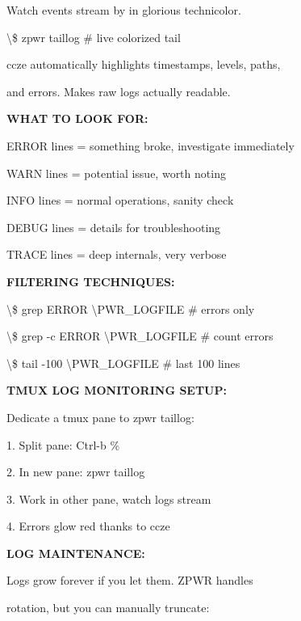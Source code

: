 \documentclass[11pt,a4paper,twoside]{book}
\begin{document}
Watch events stream by in glorious technicolor.

\begin{codebox}
\textbackslash{}\$ zpwr taillog                \# live colorized tail\\
\end{codebox}

ccze automatically highlights timestamps, levels, paths,

and errors. Makes raw logs actually readable.


\vspace{12pt}
{\bfseries\color{neonyellow} WHAT TO LOOK FOR:}\vspace{4pt}

ERROR  lines = something broke, investigate immediately

WARN   lines = potential issue, worth noting

INFO   lines = normal operations, sanity check

DEBUG  lines = details for troubleshooting

TRACE  lines = deep internals, very verbose


\vspace{12pt}
{\bfseries\color{neonyellow} FILTERING TECHNIQUES:}\vspace{4pt}

\textbackslash{}\$ grep ERROR \textbackslash{}PWR\_LOGFILE     \# errors only

\textbackslash{}\$ grep -c ERROR \textbackslash{}PWR\_LOGFILE  \# count errors

\textbackslash{}\$ tail -100 \textbackslash{}PWR\_LOGFILE      \# last 100 lines


\vspace{12pt}
{\bfseries\color{neonyellow} TMUX LOG MONITORING SETUP:}\vspace{4pt}

Dedicate a tmux pane to zpwr taillog:

1. Split pane: Ctrl-b \%

2. In new pane: zpwr taillog

3. Work in other pane, watch logs stream

4. Errors glow red thanks to ccze


\vspace{12pt}
{\bfseries\color{neonyellow} LOG MAINTENANCE:}\vspace{4pt}

Logs grow forever if you let them. ZPWR handles

rotation, but you can manually truncate:
\end{document}
